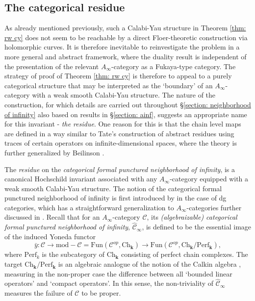 \documentclass[11pt]{amsproc}
\def\K{{\mathbf{k}}}
\def\cc{\mathcal{C}}
\def\rmod{\mathrm{mod\!-\!}}
\def\ainf{A_\infty}
\def\ch{\mathrm{Ch}}
\def\perf{\mathrm{Perf}}
\def\fun{\mathrm{Fun}}
\def\cinf{\widehat{\cc}_{\infty}}
\theoremstyle{remark}
\numberwithin{equation}{section}
\begin{document}
\subsection{The categorical residue}

As already mentioned previously, 
such a Calabi-Yau structure in Theorem \ref{thm: rw cy} does not seem to be reachable by a direct Floer-theoretic construction via holomorphic curves.
It is therefore inevitable to reinvestigate the problem in a more general and abstract framework,
where the duality result is independent of the presentation of the relevant $\ainf$-category as a Fukaya-type category.
The strategy of proof of Theorem \ref{thm: rw cy} is therefore to appeal to a purely categorical structure that may be interpreted as the `boundary' of an $\ainf$-category with a weak smooth Calabi-Yau structure.
The nature of the construction,
for which details are carried out throughout \S\ref{section: neighborhood of infinity} also based on results in \S\ref{section: ainf},
 suggests an appropriate name for this invariant - {\it the residue}.
One reason for this is that the chain level maps are defined in a way similar to Tate's construction of abstract residues \cite{tate_residue} using traces of certain operators on infinite-dimensional spaces,
where the theory is further generalized by Beilinson \cite{beilinson}.

The {\it residue} on the {\it categorical formal punctured neighborhood of infinity}, 
is a canonical Hochschild invariant associated with any $\ainf$-category equipped with a weak smooth Calabi-Yau structure.
The notion of the categorical formal punctured neighborhood of infinity is first introduced by \cite{efimov2} in the case of dg categories,
which has a straightforward generalization to $\ainf$-categories further discussed in \cite{GGV}.
Recall that for an $\ainf$-category $\cc$, 
its {\it (algebraizable) categorical formal punctured neighborhood of infinity}, $\cinf$,
is defined to be the essential image of the induced Yoneda functor
\begin{equation}\label{calkin yoneda}
\bar{y}: \cc \to \rmod \cc = \fun(\cc^{op}, \ch_{\K}) \to \fun(\cc^{op}, \ch_{\K} / \perf_{\K}),
\end{equation}
where $\perf_{k}$ is the subcategory of $\ch_{\K}$ consisting of perfect chain complexes.
The target $\ch_{\K}/\perf_{\K}$ is an algebraic analogue of the notion of the Calkin algebra \cite{calkin},
measuring in the non-proper case the difference between all `bounded linear operators' and `compact operators'.
In this sense, the non-triviality of $\cinf$ measures the failure of $\cc$ to be proper.
\end{document}
